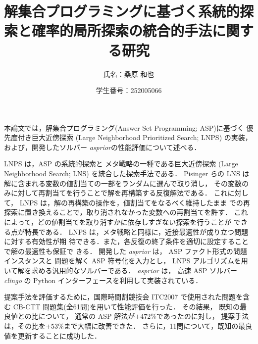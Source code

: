 \documentclass[dvipdfmx,a4paper]{jsarticle}
\title{\vspace{-3cm}解集合プログラミングに基づく系統的探索と確率的局所探索の統合的手法に関する研究}
\author{氏名：桑原 和也}
\date{学生番号：252005066}
\begin{document}
\maketitle

本論文では，解集合プログラミング(Answer Set Programming; ASP)に基づく
優先度付き巨大近傍探索 (Large Neighborhood Prioritized Search; LNPS)
の実装，および，開発したソルバー \textit{asprior}の性能評価について述べる．


%
LNPS は，ASP の系統的探索と
メタ戦略の一種である巨大近傍探索
(Large Neighborhood Search; LNS)
を統合した探索手法である．
%
Pisinger らの LNS は解に含まれる変数の値割当ての一部をランダムに選んで取り消し，
その変数のみに対して再割当てを行うことで解を再構築する反復解法である．
これに対して，
LNPS は，解の再構築の操作を，値割当てをなるべく維持したまま
での再探索に置き換えることで，取り消されなかった変数への再割当てを許す．
これによって，どの値割当てを取り消すかに依存しすぎない探索を行うことが
できる点が特長である．
LNPS は，メタ戦略と同様に，近接最適性が成り立つ問題に対する有効性が期
待できる．また，各反復の終了条件を適切に設定することで解の最適性も保証で
きる．
開発した \textit{asprior} は，
ASP ファクト形式の問題インスタンスと
問題を解く ASP 符号化を入力とし，
LNPS アルゴリズムを用いて解を求める汎用的なソルバーである．
\textit{asprior} は，
高速 ASP ソルバー \textit{clingo}
の Python インターフェースを利用して実装されている．


%
提案手法を評価するために，国際時間割競技会 ITC2007
で使用された問題を含む CB-CTT 問題集(全61問)を用いて性能評価を行った．
その結果，
既知の最良値との比について，
通常の ASP 解法が$+472\%$であったのに対し，
提案手法は，その比を$+53\%$まで大幅に改善できた．
さらに，11問について，既知の最良値を更新することに成功した．
\end{document}
